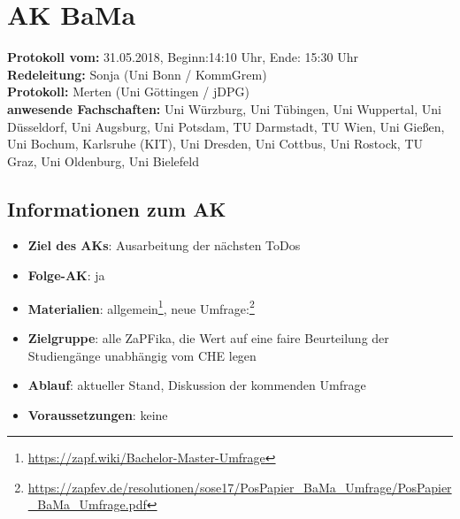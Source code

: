 
\section{AK BaMa}

	\textbf{Protokoll vom:} 31.05.2018,
	Beginn:14:10 Uhr,
	Ende: 15:30 Uhr \\
	\textbf{Redeleitung:} Sonja (Uni Bonn / KommGrem) \\
	\textbf{Protokoll:} Merten (Uni Göttingen / jDPG) \\
	\textbf{anwesende Fachschaften:} Uni Würzburg, Uni Tübingen, Uni Wuppertal, Uni Düsseldorf, Uni Augsburg, Uni Potsdam, TU Darmstadt, TU Wien, Uni Gießen, Uni Bochum, Karlsruhe (KIT), Uni Dresden, Uni Cottbus, Uni Rostock, TU Graz, Uni Oldenburg, Uni Bielefeld

	\subsection*{Informationen zum AK}
		\begin{itemize}
			\item \textbf{Ziel des AKs}: Ausarbeitung der nächsten ToDos
			\item \textbf{Folge-AK}: ja
      \item \textbf{Materialien}: allgemein\footnote{\url{https://zapf.wiki/Bachelor-Master-Umfrage}}, neue Umfrage:\footnote{\url{https://zapfev.de/resolutionen/sose17/PosPapier_BaMa_Umfrage/PosPapier_BaMa_Umfrage.pdf}}
			\item \textbf{Zielgruppe}: alle ZaPFika, die Wert auf eine faire Beurteilung der Studiengänge unabhängig vom CHE legen
			\item \textbf{Ablauf}: aktueller Stand, Diskussion der kommenden Umfrage
			\item \textbf{Voraussetzungen}: keine
		\end{itemize}

